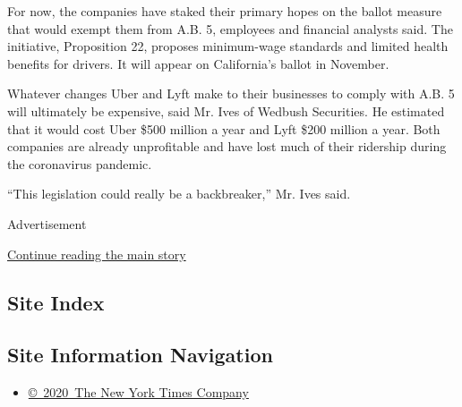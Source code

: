 For now, the companies have staked their primary hopes on the ballot
measure that would exempt them from A.B. 5, employees and financial
analysts said. The initiative, Proposition 22, proposes minimum-wage
standards and limited health benefits for drivers. It will appear on
California's ballot in November.

Whatever changes Uber and Lyft make to their businesses to comply with
A.B. 5 will ultimately be expensive, said Mr. Ives of Wedbush
Securities. He estimated that it would cost Uber \$500 million a year
and Lyft \$200 million a year. Both companies are already unprofitable
and have lost much of their ridership during the coronavirus pandemic.

``This legislation could really be a backbreaker,'' Mr. Ives said.

Advertisement

\protect\hyperlink{after-bottom}{Continue reading the main story}

\hypertarget{site-index}{%
\subsection{Site Index}\label{site-index}}

\hypertarget{site-information-navigation}{%
\subsection{Site Information
Navigation}\label{site-information-navigation}}

\begin{itemize}
\tightlist
\item
  \href{https://help.nytimes3xbfgragh.onion/hc/en-us/articles/115014792127-Copyright-notice}{©~2020~The
  New York Times Company}
\end{itemize}

